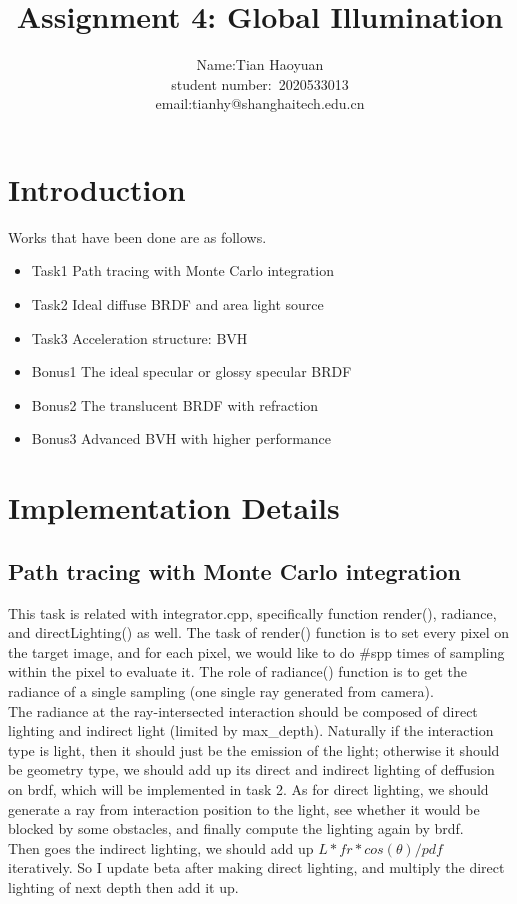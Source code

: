 \documentclass[acmtog]{acmart}
\title{Assignment 4: {Global Illumination}}
\author{Name:\quad Tian Haoyuan  \\ student number:\ 2020533013
\\email:\quad tianhy@shanghaitech.edu.cn}
\begin{document}
\maketitle

\vspace*{2 ex}

\section{Introduction}
Works that have been done are as follows.
\begin{itemize}
	\item Task1 Path tracing with Monte Carlo integration
	\item Task2 Ideal diffuse BRDF and area light source
	\item Task3 Acceleration structure: BVH
	\item Bonus1 The ideal specular or glossy specular BRDF
	\item Bonus2 The translucent BRDF with refraction
	\item Bonus3 Advanced BVH with higher performance
\end{itemize}

\section{Implementation Details}
\subsection{Path tracing with Monte Carlo integration}
This task is related with integrator.cpp, specifically function render(), radiance, and directLighting() as well.
The task of render() function is to set every pixel on the target image, and for each pixel, we would like to do \#spp times of sampling within the pixel to evaluate it.
The role of radiance() function is to get the radiance of a single sampling (one single ray generated from camera).\\
The radiance at the ray-intersected interaction should be composed of direct lighting and indirect light (limited by max\_depth).
Naturally if the interaction type is light, then it should just be the emission of the light; otherwise it should be geometry type, we should add up its direct and indirect lighting of deffusion on brdf, which will be implemented in task 2.
As for direct lighting, we should generate a ray from interaction position to the light, see whether it would be blocked by some obstacles, and finally compute the lighting again by brdf.\\
Then goes the indirect lighting, we should add up $L*fr*cos(\theta)/pdf$ iteratively. So I update beta after making direct lighting, and multiply the direct lighting of next depth then add it up.
\end{document}
